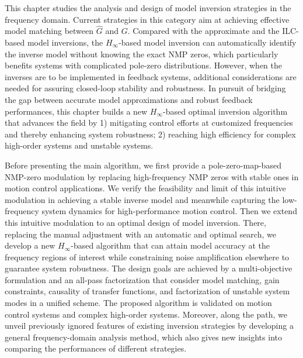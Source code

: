 \documentclass [11pt, proquest] {uwthesis}[2020/02/24]
\begin{document}
This chapter studies the analysis and design of model inversion strategies
in the frequency domain. Current strategies in this category aim at
achieving effective model matching between $\hat{G}$ and $G$. Compared
with the approximate and the ILC-based model inversions, the $H_{\infty}$-based
model inversion can automatically identify the inverse model without
knowing the exact NMP zeros, which particularly benefits systems with
complicated pole-zero distributions. However, when the inverses are
to be implemented in feedback systems, additional considerations are
needed for assuring closed-loop stability and robustness. In pursuit
of bridging the gap between accurate model approximations and robust
feedback performances, this chapter builds a new $H_{\infty}$-based
optimal inversion algorithm that advances the field by 1) mitigating
control efforts at customized frequencies and thereby enhancing system
robustness; 2) reaching high efficiency for complex high-order systems
and unstable systems.

Before presenting the main algorithm, we first provide a pole-zero-map-based
NMP-zero modulation by replacing high-frequency NMP zeros with stable
ones in motion control applications. We verify the feasibility and
limit of this intuitive modulation in achieving a stable inverse model
and meanwhile capturing the low-frequency system dynamics for high-performance
motion control. Then we extend this intuitive modulation to an optimal
design of model inversion. There, replacing the manual adjustment
with an automatic and optimal search, we develop a new $H_{\infty}$-based
algorithm that can attain model accuracy at the frequency regions
of interest while constraining noise amplification elsewhere to guarantee
system robustness. The design goals are achieved by a multi-objective
formulation and an all-pass factorization that consider model matching,
gain constraints, causality of transfer functions, and factorization
of unstable system modes in a unified scheme. The proposed algorithm
is validated on motion control systems and complex high-order systems.
Moreover, along the path, we unveil previously ignored features of
existing inversion strategies by developing a general frequency-domain
analysis method, which also gives new insights into comparing the
performances of different strategies.
\end{document}
